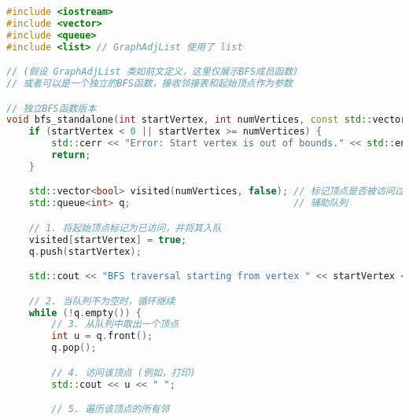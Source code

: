 \begin{lstlisting}[language=cpp]
#include <iostream>
#include <vector>
#include <queue>
#include <list> // GraphAdjList 使用了 list

// (假设 GraphAdjList 类如前文定义，这里仅展示BFS成员函数)
// 或者可以是一个独立的BFS函数，接收邻接表和起始顶点作为参数

// 独立BFS函数版本
void bfs_standalone(int startVertex, int numVertices, const std::vector<std::list<EdgeNode>>& adjList) {
    if (startVertex < 0 || startVertex >= numVertices) {
        std::cerr << "Error: Start vertex is out of bounds." << std::endl;
        return;
    }

    std::vector<bool> visited(numVertices, false); // 标记顶点是否被访问过
    std::queue<int> q;                             // 辅助队列

    // 1. 将起始顶点标记为已访问，并将其入队
    visited[startVertex] = true;
    q.push(startVertex);

    std::cout << "BFS traversal starting from vertex " << startVertex << ": ";

    // 2. 当队列不为空时，循环继续
    while (!q.empty()) {
        // 3. 从队列中取出一个顶点
        int u = q.front();
        q.pop();

        // 4. 访问该顶点 (例如，打印)
        std::cout << u << " ";

        // 5. 遍历该顶点的所有邻
\end{lstlisting}